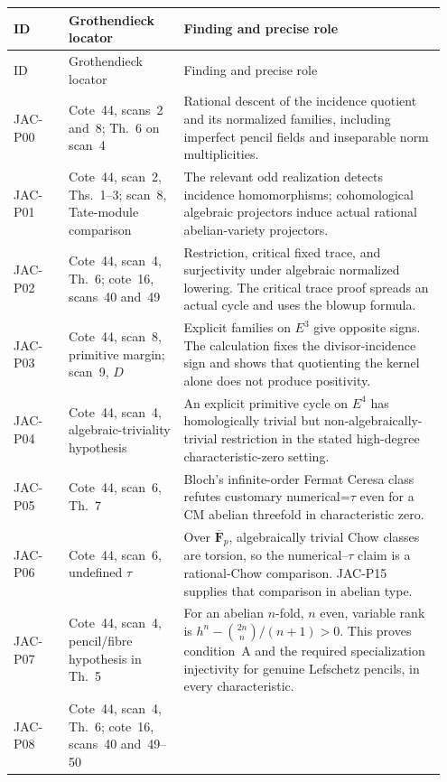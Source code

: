 \documentclass[11pt,a4paper]{article}
\begin{document}
\begingroup
\small
\setlength{\tabcolsep}{4pt}
\renewcommand{\arraystretch}{1.12}
\begin{longtable}{@{}p{0.12\linewidth}p{0.25\linewidth}p{0.58\linewidth}@{}}
\toprule
ID & Grothendieck locator & Finding and precise role\\
\midrule
\endfirsthead
\toprule
ID & Grothendieck locator & Finding and precise role\\
\midrule
\endhead
JAC-P00 & Cote~44, scans~2 and~8; Th.~6 on scan~4 &
Rational descent of the incidence quotient and its normalized
families, including imperfect pencil fields and inseparable
norm multiplicities.\\
JAC-P01 & Cote~44, scan~2, Ths.~1--3; scan~8, Tate-module comparison &
The relevant odd realization detects incidence homomorphisms;
cohomological algebraic projectors induce actual rational
abelian-variety projectors.\\
JAC-P02 & Cote~44, scan~4, Th.~6; cote~16, scans~40 and~49 &
Restriction, critical fixed trace, and surjectivity under algebraic
normalized lowering. The critical trace proof spreads an actual
cycle and uses the blowup formula.\\
JAC-P03 & Cote~44, scan~8, primitive margin; scan~9, $D$ &
Explicit families on $E^3$ give opposite signs. The calculation
fixes the divisor-incidence sign and shows that quotienting the
kernel alone does not produce positivity.\\
JAC-P04 & Cote~44, scan~4, algebraic-triviality hypothesis &
An explicit primitive cycle on $E^4$ has homologically trivial
but non-algebraically-trivial restriction in the stated high-degree
characteristic-zero setting.\\
JAC-P05 & Cote~44, scan~6, Th.~7 &
Bloch's infinite-order Fermat Ceresa class refutes customary
numerical=$\tau$ even for a CM abelian threefold in characteristic zero.\\
JAC-P06 & Cote~44, scan~6, undefined $\tau$ &
Over $\overline{\mathbf F}_p$, algebraically trivial Chow classes
are torsion, so the numerical--$\tau$ claim is a rational-Chow
comparison. JAC-P15 supplies that comparison in abelian type.\\
JAC-P07 & Cote~44, scan~4, pencil/fibre hypothesis in Th.~5 &
For an abelian $n$-fold, $n$ even, variable rank is
$h^n-\binom{2n}{n}/(n+1)>0$. This proves condition~A and
the required specialization injectivity for genuine Lefschetz
pencils, in every characteristic.\\
JAC-P08 & Cote~44, scan~4, Th.~6; cote~16, scans~40 and~49--50 &

\end{longtable}
\end{document}
